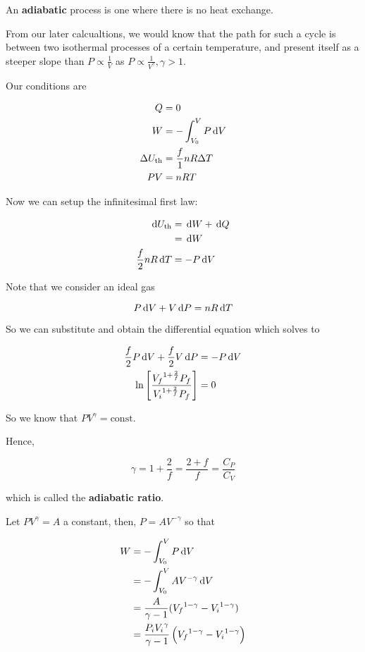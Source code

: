 An \textbf{adiabatic} process is one where there is no heat exchange.

From our later calcualtions, we would know that the path for such a cycle is between two isothermal processes of a certain temperature, and present itself as a steeper slope than $P \propto \frac{1}{V}$ as $P \propto \frac{1}{V^\gamma}, \gamma > 1$.

Our conditions are

\begin{align}
	Q &= 0\\
	W &= - \int_{V_0}^V P\D V\\
	\Delta U_\mathrm{th} &= \frac{f}{1}nR\Delta T\\
	PV &= nRT
\end{align}

Now we can setup the infinitesimal first law:

\begin{align}
	\D U_\mathrm{th} &= \D W + \D Q\\
	&= \D W\\
	\frac{f}{2}nR\D T &= -P \D V
\end{align}

Note that we consider an ideal gas

\begin{equation}
	P\D V + V \D P = nR\D T
\end{equation}

So we can substitute and obtain the differential equation which solves to

\begin{align}
	\frac{f}{2} P \D V + \frac{f}{2}V \D P &= - P \D V\\
	\ln\left[\frac{{V_f}^{1 + \frac{2}{f}} P_f}{{V_i}^{1 + \frac{2}{f}} P_f}\right] &= 0
\end{align}

So we know that $PV^\gamma = \mathrm{const}$.

Hence, 

\begin{equation}
	\gamma = 1 + \frac{2}{f} = \frac{2 + f}{f} = \frac{C_P}{C_V}
\end{equation}

which is called the \textbf{adiabatic ratio}.

Let $PV^\gamma = A$ a constant, then, $P = AV^{-\gamma}$ so that

\begin{align}
	W &= - \int_{V_0}^V  P \D V\\
	&= - \int_{V_0}^V A V^{-\gamma} \D V\\
	&= \frac{A}{\gamma - 1}({V_f}^{1-\gamma} - {V_i}^{1-\gamma})\\
	&= \frac{P_i {V_i}^\gamma}{\gamma - 1} \left({V_f}^{1-\gamma} - {V_i}^{1-\gamma}\right)
\end{align}

